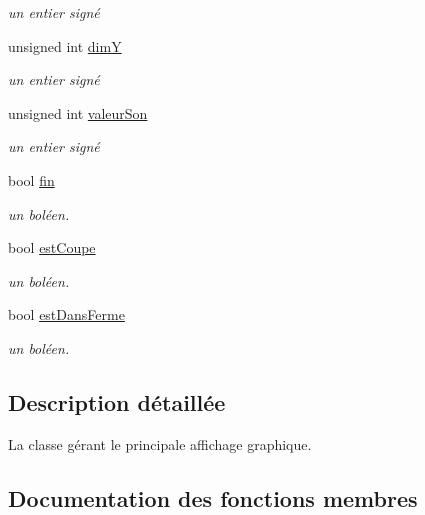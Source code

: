 \begin{DoxyCompactItemize}
\begin{DoxyCompactList}\small\item\em un entier signé \end{DoxyCompactList}\item 
unsigned int \hyperlink{class_s_f_m_l_menu_a31f77dcaeee348f69734c9ed010ad759}{dimY}
\begin{DoxyCompactList}\small\item\em un entier signé \end{DoxyCompactList}\item 
unsigned int \hyperlink{class_s_f_m_l_menu_a03b29038855c220ead32206cf99d258b}{valeur\+Son}
\begin{DoxyCompactList}\small\item\em un entier signé \end{DoxyCompactList}\item 
bool \hyperlink{class_s_f_m_l_menu_aab0fff32068b15d9b7e2a9ba598aa5eb}{fin}
\begin{DoxyCompactList}\small\item\em un boléen. \end{DoxyCompactList}\item 
bool \hyperlink{class_s_f_m_l_menu_a2ae2e3fe14e1c2589026d8ad86229328}{est\+Coupe}
\begin{DoxyCompactList}\small\item\em un boléen. \end{DoxyCompactList}\item 
bool \hyperlink{class_s_f_m_l_menu_ab20d9203dca5e9bcd0c006e51c14f0b2}{est\+Dans\+Ferme}
\begin{DoxyCompactList}\small\item\em un boléen. \end{DoxyCompactList}\end{DoxyCompactItemize}


\subsection{Description détaillée}
La classe gérant le principale affichage graphique. 

\subsection{Documentation des fonctions membres}
\mbox{\label{class_s_f_m_l_menu_abbed99b9e874fd8e3f40a7b748576182}} 
